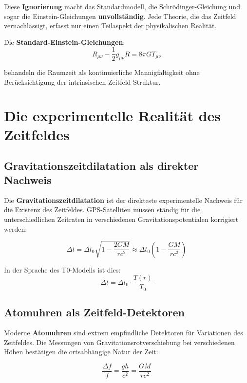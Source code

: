 \documentclass[12pt,a4paper]{report}
\begin{document}
Diese \textbf{Ignorierung} macht das Standardmodell, die Schrödinger-Gleichung und sogar die Einstein-Gleichungen \textbf{unvollständig}. Jede Theorie, die das Zeitfeld vernachlässigt, erfasst nur einen Teilaspekt der physikalischen Realität.

Die \textbf{Standard-Einstein-Gleichungen}:
\begin{equation}
	R_{\mu\nu} - \frac{1}{2}g_{\mu\nu}R = 8\pi G T_{\mu\nu}
\end{equation}

behandeln die Raumzeit als kontinuierliche Mannigfaltigkeit ohne Berücksichtigung der intrinsischen Zeitfeld-Struktur.

\section{Die experimentelle Realität des Zeitfeldes}

\subsection{Gravitationszeitdilatation als direkter Nachweis}

Die \textbf{Gravitationszeitdilatation} ist der direkteste experimentelle Nachweis für die Existenz des Zeitfeldes. GPS-Satelliten müssen ständig für die unterschiedlichen Zeitraten in verschiedenen Gravitationspotentialen korrigiert werden:

\begin{equation}
	\Delta t = \Delta t_0 \sqrt{1 - \frac{2GM}{rc^2}} \approx \Delta t_0 \left(1 - \frac{GM}{rc^2}\right)
\end{equation}

In der Sprache des T0-Modells ist dies:
\begin{equation}
	\Delta t = \Delta t_0 \cdot \frac{T(r)}{T_0}
\end{equation}

\subsection{Atomuhren als Zeitfeld-Detektoren}

Moderne \textbf{Atomuhren} sind extrem empfindliche Detektoren für Variationen des Zeitfeldes. Die Messungen von Gravitationsrotverschiebung bei verschiedenen Höhen bestätigen die ortsabhängige Natur der Zeit:

\begin{equation}
	\frac{\Delta f}{f} = \frac{gh}{c^2} = \frac{GM}{rc^2}
\end{equation}
\end{document}
